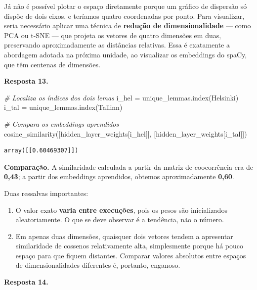 \documentclass[
  brazilian,
]{article}
\newenvironment{Shaded}{}{}
\newcommand{\CommentTok}[1]{\textcolor[rgb]{0.38,0.63,0.69}{\textit{#1}}}
\newcommand{\NormalTok}[1]{#1}
\newcommand{\OperatorTok}[1]{\textcolor[rgb]{0.40,0.40,0.40}{#1}}
\newcommand{\StringTok}[1]{\textcolor[rgb]{0.25,0.44,0.63}{#1}}
\providecommand{\tightlist}{%
  \setlength{\itemsep}{0pt}\setlength{\parskip}{0pt}}
\begin{document}
Já não é possível plotar o espaço diretamente porque um gráfico de
dispersão só dispõe de dois eixos, e teríamos quatro coordenadas por
ponto. Para visualizar, seria necessário aplicar uma técnica de
\textbf{redução de dimensionalidade} --- como PCA ou t-SNE --- que
projeta os vetores de quatro dimensões em duas, preservando
aproximadamente as distâncias relativas. Essa é exatamente a abordagem
adotada na próxima unidade, ao visualizar os embeddings do spaCy, que
têm centenas de dimensões.

\textbf{Resposta 13.}

\begin{Shaded}
\begin{Highlighting}[]
\CommentTok{\# Localiza os índices dos dois lemas}
\NormalTok{i\_hel }\OperatorTok{=}\NormalTok{ unique\_lemmas.index(}\StringTok{\textquotesingle{}Helsinki\textquotesingle{}}\NormalTok{)}
\NormalTok{i\_tal }\OperatorTok{=}\NormalTok{ unique\_lemmas.index(}\StringTok{\textquotesingle{}Tallinn\textquotesingle{}}\NormalTok{)}

\CommentTok{\# Compara os embeddings aprendidos}
\NormalTok{cosine\_similarity([hidden\_layer\_weights[i\_hel]], [hidden\_layer\_weights[i\_tal]])}
\end{Highlighting}
\end{Shaded}

\begin{verbatim}
array([[0.60469307]])
\end{verbatim}

\textbf{Comparação.} A similaridade calculada a partir da matriz de
coocorrência era de \textbf{0,43}; a partir dos embeddings aprendidos,
obtemos aproximadamente \textbf{0,60}.

Duas ressalvas importantes:

\begin{enumerate}
\def\labelenumi{\arabic{enumi}.}
\tightlist
\item
  O valor exato \textbf{varia entre execuções}, pois os pesos são
  inicializados aleatoriamente. O que se deve observar é a tendência,
  não o número.
\item
  Em apenas duas dimensões, quaisquer dois vetores tendem a apresentar
  similaridade de cossenos relativamente alta, simplesmente porque há
  pouco espaço para que fiquem distantes. Comparar valores absolutos
  entre espaços de dimensionalidades diferentes é, portanto, enganoso.
\end{enumerate}

\textbf{Resposta 14.}
\end{document}
